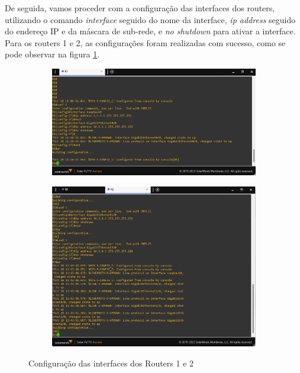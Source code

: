 \documentclass[11pt,english, openright, oneside]{book}
\begin{document}
\newpage
De seguida, vamos proceder com a configuração das interfaces dos routers, utilizando o comando \textit{interface} seguido do nome da interface, \textit{ip address} seguido do endereço IP e da máscara de sub-rede, e \textit{no shutdown} para ativar a interface. Para os routers 1 e 2, as configurações foram realizadas com sucesso, como se pode observar na figura \ref{fig:config2}.
\vspace{0.2cm}

\begin{figure}[h]
  \centering
  \begin{subfigure}{.6\textwidth}
      \centering
      \includegraphics[width=1\linewidth]{imagens/Tarefa1/2.int_conf_R1.png}
  \end{subfigure}%
  \begin{subfigure}{.4\textwidth}
      \centering
      \includegraphics[width=1\linewidth]{imagens/Tarefa1/2.int_conf_R2.png}
  \end{subfigure}
  \caption{Configuração das interfaces dos Routers 1 e 2}
  \label{fig:config2}
\end{figure}
\vspace{0.2cm}
\end{document}
